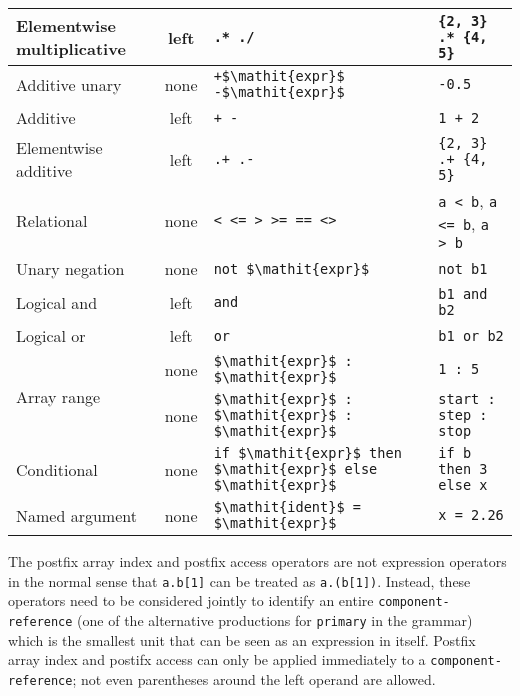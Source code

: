 \begin{table}[H]
\begin{center}
\begin{tabular}{l c l l}
Elementwise multiplicative & left & {\lstinline!.* ./!} & {\lstinline!{2, 3} .* {4, 5}!}\\
\hline
Additive unary & none & {\lstinline!+$\mathit{expr}$ -$\mathit{expr}$!} & {\lstinline!-0.5!}\\
\hline
Additive & left & {\lstinline!+ -!} & {\lstinline!1 + 2!}\\
Elementwise additive & left & {\lstinline!.+ .-!} & {\lstinline!{2, 3} .+ {4, 5}!}\\
\hline
Relational & none & {\lstinline!< <= > >= == <>!} & {\lstinline!a < b!}, {\lstinline!a <= b!}, {\lstinline!a > b!}\\
\hline
Unary negation & none & {\lstinline!not $\mathit{expr}$!} & {\lstinline!not b1!}\\
\hline
Logical and & left & {\lstinline!and!} & {\lstinline!b1 and b2!}\\
\hline
Logical or & left & {\lstinline!or!} & {\lstinline!b1 or b2!}\\
\hline
\multirow{2}{*}{Array range} & none & {\lstinline!$\mathit{expr}$ : $\mathit{expr}$!} & {\lstinline!1 : 5!}\\
                             & none & {\lstinline!$\mathit{expr}$ : $\mathit{expr}$ : $\mathit{expr}$!} & {\lstinline!start : step : stop!}\\
\hline
Conditional & none & {\lstinline!if $\mathit{expr}$ then $\mathit{expr}$ else $\mathit{expr}$!} & {\lstinline!if b then 3 else x!}\\
\hline
Named argument & none & {\lstinline!$\mathit{ident}$ = $\mathit{expr}$!} & {\lstinline!x = 2.26!}\\
\hline
\end{tabular}
\end{center}
\end{table}

The postfix array index and postfix access operators are not expression operators in the normal sense that \lstinline!a.b[1]! can be treated as \lstinline!a.(b[1])!.
Instead, these operators need to be considered jointly to identify an entire \lstinline[language=grammar]!component-reference! (one of the alternative productions for \lstinline[language=grammar]!primary! in the grammar) which is the smallest unit that can be seen as an expression in itself.
Postfix array index and postifx access can only be applied immediately to a \lstinline[language=grammar]!component-reference!; not even parentheses around the left operand are allowed.

